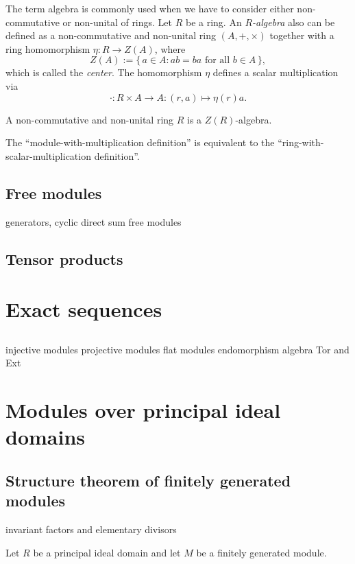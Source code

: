 \documentclass{../../large}
\begin{document}
\begin{prb}
The term algebra is commonly used when we have to consider either non-commutative or non-unital of rings.
Let $R$ be a ring.
An \emph{$R$-algebra} also can be defined as a non-commutative and non-unital ring $(A,+,\times)$ together with a ring homomorphism $\eta:R\to Z(A)$, where
\[Z(A):=\{\,a\in A:ab=ba\text{ for all }b\in A\,\},\]
which is called the \emph{center}.
The homomorphism $\eta$ defines a scalar multiplication via
\[\cdot:R\times A\to A:(r,a)\mapsto\eta(r)a.\]
\begin{parts}
\item A non-commutative and non-unital ring $R$ is a $Z(R)$-algebra.
\item The ``module-with-multiplication definition'' is equivalent to the ``ring-with-scalar-multiplication definition''.
\end{parts}
\end{prb}


\section{Free modules}
generators, cyclic
direct sum
free modules

\section{Tensor products}



\chapter{Exact sequences}
\section{}
injective modules
projective modules
flat modules
endomorphism algebra
Tor and Ext


\chapter{Modules over principal ideal domains}
\section{Structure theorem of finitely generated modules}
invariant factors and elementary divisors

\begin{prb}
Let $R$ be a principal ideal domain and let $M$ be a finitely generated module.

\end{prb}
\end{document}
